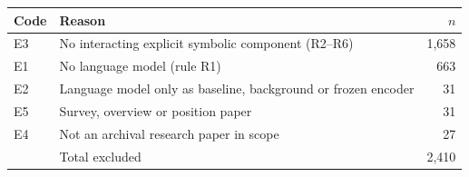 \begin{tabular}{@{}lp{}r@{}}
\toprule
Code & Reason & $n$ \\
\midrule
E3 & No interacting explicit symbolic component (R2--R6) & 1,658 \\
E1 & No language model (rule R1) & 663 \\
E2 & Language model only as baseline, background or frozen encoder & 31 \\
E5 & Survey, overview or position paper & 31 \\
E4 & Not an archival research paper in scope & 27 \\
\midrule
& Total excluded & 2,410 \\
\bottomrule
\end{tabular}
